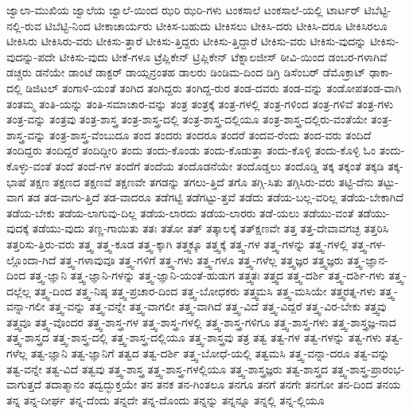 {ಜ್ವಾಲಾ-ಮುಖಿಯ
ಜ್ವಾಲೆಯ
ಜ್ವಾಲೆ-ಯಿಂದ
ಝರಿ
ಝರಿ-ಗಳು
ಟಂಕಸಾಲೆ
ಟಂಕಸಾಲೆ-ಯಲ್ಲಿ
ಟಾರ್ಟರ್
ಟಿಬೆಟ್ಟಿ-ನಲ್ಲಿ-ರುವ
ಟಿಬೆಟ್ಟಿ-ನಿಂದ
ಟೀಕಾಚಾರ್ಯರು
ಟೀಕಿಸ-ಬಹುದು
ಟೀಕಿಸಲು
ಟೀಕಿಸಿ-ದರು
ಟೀಕಿಸಿ-ದರೂ
ಟೀಕಿಸಿರಲೂ
ಟೀಕಿಸಿರು
ಟೀಕಿಸಿರು-ವರು
ಟೀಕಿಸು-ತ್ತಾರೆ
ಟೀಕಿಸು-ತ್ತಿದ್ದರು
ಟೀಕಿಸು-ತ್ತಿದ್ದಾರೆ
ಟೀಕಿಸು-ವರು
ಟೀಕಿಸು-ವುದನ್ನು
ಟೀಕಿಸು-ವುದನ್ನು-ಪದೇ
ಟೀಕಿಸು-ವುದು
ಟೀಕೆ-ಗಳೂ
ಟ್ರೆಪ್ಲಿಕೇನ್
ಟ್ರಿಪ್ಲಿಕೇನ್
ಟೆಕ್ನಾಲಜೀಸ್
ಠೀವಿ-ಯಿಂದ
ಡಂಬರ-ಗಳಾಗಿವೆ
ಡಚ್ಚರು
ಡನೆಯೇ
ಡಾಂಟೆ
ಡಾಕ್ಟರ್
ಡಾಯ್ಸನ್ರಂತಹ
ಡಾಲರು
ಡಿಂಡಿಮ-ದಿಂದ
ಡಿಗ್ರಿ
ಡಿಸೆಂಬರ್
ಡೆಮೊಕ್ರಾಟ್
ಢಾಕಾ-ದಲ್ಲಿ
ಡಿಜಿಟಲ್
ತಂಗಾಳಿ-ಯಂತೆ
ತಂಗಿದ
ತಂಗಿದ್ದರು
ತಂಗಿದ್ದ-ರುರ
ತಂಡ-ದವರು
ತಂಡ-ವನ್ನು
ತಂಡೋಪತಂಡ-ವಾಗಿ
ತಂತಮ್ಮ
ತಂತಿ-ಯನ್ನು
ತಂತಿ-ಸಮಾಚಾರ-ವನ್ನು
ತಂತ್ರ
ತಂತ್ರಕ್ಕೆ
ತಂತ್ರ-ಗಳಲ್ಲಿ
ತಂತ್ರ-ಗಳಿಂದ
ತಂತ್ರ-ಗಳಿವೆ
ತಂತ್ರ-ಗಳು
ತಂತ್ರ-ವನ್ನು
ತಂತ್ರವು
ತಂತ್ರ-ಶಾಸ್ತ್ರ
ತಂತ್ರ-ಶಾಸ್ತ್ರ-ದಲ್ಲಿ
ತಂತ್ರ-ಶಾಸ್ತ್ರ-ದಲ್ಲಿಯೂ
ತಂತ್ರ-ಶಾಸ್ತ್ರ-ದಲ್ಲಿರು-ವಂತೆಯೇ
ತಂತ್ರ-ಶಾಸ್ತ್ರ-ವನ್ನು
ತಂತ್ರ-ಶಾಸ್ತ್ರ-ವೆಂಬುದೂ
ತಂದ
ತಂದರು
ತಂದರೂ
ತಂದರೆ
ತಂದವ-ರೆಂದು
ತಂದ-ವರು
ತಂದಿದೆ
ತಂದಿದ್ದರು
ತಂದಿದ್ದರೆ
ತಂದಿದ್ದೀರಿ
ತಂದು
ತಂದು-ಕೊಂಡು
ತಂದು-ಕೊಡುತ್ತಾ
ತಂದು-ಕೊಳ್ಳಿ
ತಂದು-ಕೊಳ್ಳಿ ಓಂ
ತಂದು-ಕೊಳ್ಳು-ವಂತೆ
ತಂದೆ
ತಂದೆ-ಗಳ
ತಂದೆಗೆ
ತಂದೆಯ
ತಂದೊಡನೆಯೇ
ತಂದೊಡ್ಡಲು
ತಂದೊಡ್ಡಿ
ತಕ್ಕ
ತಕ್ಕಂತೆ
ತಕ್ಕಡಿ
ತಕ್ಕ-ಭಾಷೆ
ತಕ್ಷಣ
ತಕ್ಷಣದ
ತಕ್ಷಣವೆ
ತಕ್ಷಣವೇ
ತಗಡನ್ನು
ತಗಲು-ತ್ತಿದೆ
ತಗೊ
ತಗ್ಗಿ-ಸಿತು
ತಗ್ಗಿಸಿರು-ವರು
ತಟ್ಟಿ-ದೆನು
ತಟ್ಟು-ವಾಗ
ತಡ
ತಡ-ವಾಗು-ತ್ತಿದೆ
ತಡ-ವಾದರೂ
ತಡೆಗಟ್ಟಿ
ತಡೆಗಟ್ಟು-ತ್ತವೆ
ತಡೆದು
ತಡೆಯ-ಬಲ್ಲ-ವರಿಲ್ಲ
ತಡೆಯ-ಬೇಕಾಗಿದೆ
ತಡೆಯ-ಬೇಕು
ತಡೆಯ-ಲಾಗುವು-ದಿಲ್ಲ
ತಡೆಯ-ಲಾರದು
ತಡೆಯ-ಲಾರರು
ತಡೆ-ಯಲು
ತಡೆಯು-ವಂತೆ
ತಡೆಯು-ವುದಕ್ಕೆ
ತಡೆಯು-ವುದು
ತಣ್ಣ-ಗಾಯಿತು
ತತಃ
ತತೋ
ತತ್
ತತ್ಕಾಲಕ್ಕೆ
ತತ್ಕ್ಷಣವೇ
ತತ್ತ
ತತ್ತ-ದೇವಾವಗಚ್ಛ
ತತ್ತರಿಸಿ
ತತ್ತರಿಸು-ತ್ತಿರು-ವರು
ತತ್ತ್ವ
ತತ್ತ್ವ-ಕೂಡ
ತತ್ತ್ವ-ಕ್ಕಾಗಿ
ತತ್ತ್ವಕ್ಕೂ
ತತ್ತ್ವಕ್ಕೆ
ತತ್ತ್ವ-ಗಳ
ತತ್ತ್ವ-ಗಳನ್ನು
ತತ್ತ್ವ-ಗಳಲ್ಲಿ
ತತ್ತ್ವ-ಗಳ-ಲ್ಲೊಂದಾ-ಗಿದೆ
ತತ್ತ್ವ-ಗಳಾವುವೂ
ತತ್ತ್ವ-ಗಳಿಗೆ
ತತ್ತ್ವ-ಗಳು
ತತ್ತ್ವ-ಗಳೂ
ತತ್ತ್ವ-ಗಳೆಲ್ಲ
ತತ್ತ್ವಜ್ಞರ
ತತ್ತ್ವಜ್ಞರು
ತತ್ತ್ವ-ಜ್ಞಾನ-ದಿಂದ
ತತ್ತ್ವ-ಜ್ಞಾನಿ
ತತ್ತ್ವ-ಜ್ಞಾನಿ-ಗಳನ್ನು
ತತ್ತ್ವ-ಜ್ಞಾನಿ-ಯಂತೆ-ಹುಡುಗ
ತತ್ತ್ವತಃ
ತತ್ತ್ವದ
ತತ್ತ್ವ-ದರ್ಶಿ
ತತ್ತ್ವ-ದರ್ಶಿ-ಗಳು
ತತ್ತ್ವ-ದಲ್ಲೆಲ್ಲ
ತತ್ತ್ವ-ದಿಂದ
ತತ್ತ್ವ-ನಿಷ್ಠ
ತತ್ತ್ವ-ಪ್ರಚಾರ-ದಿಂದ
ತತ್ತ್ವ-ಬೋಧಕರು
ತತ್ತ್ವಮಸಿ
ತತ್ತ್ವ-ಮಸಿಯೇ
ತತ್ತ್ವರತ್ನ-ಗಳು
ತತ್ತ್ವ-ವನ್ನಾ-ಗಲೀ
ತತ್ತ್ವ-ವನ್ನು
ತತ್ತ್ವ-ವನ್ನೇ
ತತ್ತ್ವ-ವಾಗಲೀ
ತತ್ತ್ವ-ವಾಗಿದೆ
ತತ್ತ್ವ-ವಿದೆ
ತತ್ತ್ವ-ವಿದ್ದರೆ
ತತ್ತ್ವ-ವಿರ-ಬೇಕು
ತತ್ತ್ವವು
ತತ್ತ್ವವೂ
ತತ್ತ್ವ-ವೊಂದರ
ತತ್ತ್ವ-ಶಾಸ್ತ್ರ-ಗಳ
ತತ್ತ್ವ-ಶಾಸ್ತ್ರ-ಗಳಲ್ಲಿ
ತತ್ತ್ವ-ಶಾಸ್ತ್ರ-ಗಳಿಗೂ
ತತ್ತ್ವ-ಶಾಸ್ತ್ರ-ಗಳು
ತತ್ತ್ವ-ಶಾಸ್ತ್ರಜ್ಞ-ನಾದ
ತತ್ತ್ವ-ಶಾಸ್ತ್ರದ
ತತ್ತ್ವ-ಶಾಸ್ತ್ರ-ದಲ್ಲಿ
ತತ್ತ್ವ-ಶಾಸ್ತ್ರ-ದಲ್ಲಿಯೂ
ತತ್ತ್ವ-ಶಾಸ್ತ್ರವು
ತತ್ರ
ತತ್ವ
ತತ್ವ-ಗಳ
ತತ್ವ-ಗಳನ್ನು
ತತ್ವ-ಗಳು
ತತ್ವ-ಗಳೆಲ್ಲ
ತತ್ವ-ಜ್ಞಾನಿ
ತತ್ವ-ಜ್ಞಾನಿಗೆ
ತತ್ವದ
ತತ್ವ-ದರ್ಶಿ
ತತ್ತ್ವ-ಬೋಧೆ-ಯಲ್ಲಿ
ತತ್ವಮಸಿ
ತತ್ತ್ವ-ವನ್ನಾ-ದರೂ
ತತ್ವ-ವನ್ನು
ತತ್ವ-ವನ್ನೇ
ತತ್ವ-ವಿದೆ
ತತ್ವವು
ತತ್ತ್ವ-ಶಾಸ್ತ್ರ
ತತ್ತ್ವ-ಶಾಸ್ತ್ರ-ಗಳಲ್ಲಿಯೂ
ತತ್ತ್ವ-ಶಾಸ್ತ್ರಜ್ಞರು
ತತ್ವ-ಶಾಸ್ತ್ರದ
ತತ್ತ್ವ-ಶಾಸ್ತ್ರ-ಪ್ರಾರಂಭ-ವಾಗುತ್ತದೆ
ತದಾತ್ಮಾನಂ
ತದ್ವದ್ಭುಕ್ತಯೇ
ತನ
ತನಕ
ತನ-ಗಿಂತಲೂ
ತನಗೂ
ತನಗೆ
ತನಗೇ
ತನಗೋ
ತನ-ದಿಂದ
ತನಯ
ತನ್ನ
ತನ್ನ-ದೀರ್ಘ
ತನ್ನ-ದೆಂದು
ತನ್ನದೇ
ತನ್ನ-ದೊಂದು
ತನ್ನನ್ನು
ತನ್ನನ್ನೂ
ತನ್ನಲ್ಲಿ
ತನ್ನ-ಲ್ಲಿಯೂ
}
